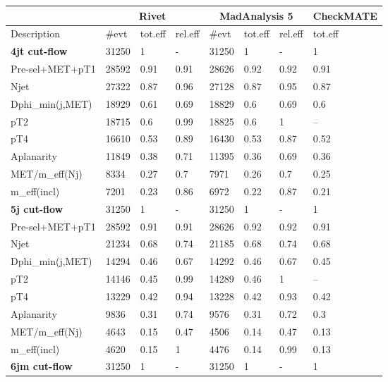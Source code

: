 \documentclass[11pt]{cernrep}
\begin{document}
\begin{table}
\begin{tabular}{ | l || l | l | l || l | l | l || l | }
\hline
    &  \multicolumn{3}{c||}{\bf Rivet} & \multicolumn{3}{c||}{\bf MadAnalysis 5} &   {\bf CheckMATE}   \\ \hline
  Description       & \#evt & tot.eff & rel.eff & \#evt & tot.eff & rel.eff &   tot.eff   \\ \hline \hline
\hline
{\bf 4jt cut-flow} & 31250 & 1 & - & 31250 & 1 & - & 1  \\ \hline
Pre-sel+MET+pT1   & 28592 & 0.91 & 0.91 & 28626 & 0.92 & 0.92 & 0.91  \\ \hline
Njet              & 27322 & 0.87 & 0.96 & 27128 & 0.87 & 0.95 & 0.87  \\ \hline
Dphi\_min(j,MET)   & 18929 & 0.61 & 0.69 & 18829 & 0.6 & 0.69 & 0.6  \\ \hline
pT2               & 18715 & 0.6 & 0.99 & 18825 & 0.6 & 1 &     --       \\ \hline
pT4               & 16610 & 0.53 & 0.89 & 16430 & 0.53 & 0.87 & 0.52  \\ \hline
Aplanarity        & 11849 & 0.38 & 0.71 & 11395 & 0.36 & 0.69 & 0.36  \\ \hline
MET/m\_eff(Nj)     & 8334 & 0.27 & 0.7 & 7971 & 0.26 & 0.7 & 0.25  \\ \hline
m\_eff(incl)       & 7201 & 0.23 & 0.86 & 6972 & 0.22 & 0.87 & 0.21  \\ \hline
\hline
{\bf 5j cut-flow} & 31250 & 1 & - & 31250 & 1 & - & 1 \\ \hline
Pre-sel+MET+pT1   & 28592 & 0.91 & 0.91 & 28626 & 0.92 & 0.92 & 0.91 \\ \hline
Njet              & 21234 & 0.68 & 0.74 & 21185 & 0.68 & 0.74 & 0.68 \\ \hline
Dphi\_min(j,MET)   & 14294 & 0.46 & 0.67 & 14292 & 0.46 & 0.67 & 0.45 \\ \hline
pT2               & 14146 & 0.45 & 0.99 & 14289 & 0.46 & 1 &    --       \\ \hline
pT4               & 13229 & 0.42 & 0.94 & 13228 & 0.42 & 0.93 & 0.42 \\ \hline
Aplanarity        & 9836 & 0.31 & 0.74 & 9576 & 0.31 & 0.72 & 0.3 \\ \hline
MET/m\_eff(Nj)     & 4643 & 0.15 & 0.47 & 4506 & 0.14 & 0.47 & 0.13 \\ \hline
m\_eff(incl)       & 4620 & 0.15 & 1 & 4476 & 0.14 & 0.99 & 0.13 \\ \hline
\hline
{\bf 6jm cut-flow} & 31250 & 1 & - & 31250 & 1 & - & 1  \\ \hline

\end{tabular}
\end{table}
\end{document}
